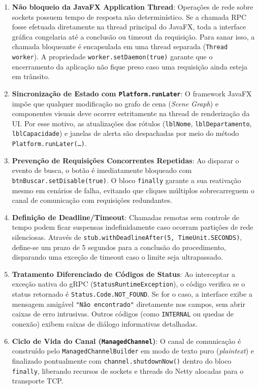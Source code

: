 \documentclass[12pt,a4paper]{article}
\begin{document}
\begin{enumerate}
    \item \textbf{Não bloqueio da JavaFX Application Thread}: Operações de rede sobre sockets possuem tempo de resposta não determinístico. Se a chamada RPC fosse efetuada diretamente na thread principal do JavaFX, toda a interface gráfica congelaria até a conclusão ou timeout da requisição. Para sanar isso, a chamada bloqueante é encapsulada em uma thread separada (\texttt{Thread worker}). A propriedade \texttt{worker.setDaemon(true)} garante que o encerramento da aplicação não fique preso caso uma requisição ainda esteja em trânsito.
    \item \textbf{Sincronização de Estado com \texttt{Platform.runLater}}: O framework JavaFX impõe que qualquer modificação no grafo de cena (\textit{Scene Graph}) e componentes visuais deve ocorrer estritamente na thread de renderização da UI. Por esse motivo, as atualizações dos rótulos (\texttt{lblNome}, \texttt{lblDepartamento}, \texttt{lblCapacidade}) e janelas de alerta são despachadas por meio do método \texttt{Platform.runLater(\dots)}.
    \item \textbf{Prevenção de Requisições Concorrentes Repetidas}: Ao disparar o evento de busca, o botão é imediatamente bloqueado com \texttt{btnBuscar.}\allowbreak\texttt{setDisable(true)}. O bloco \texttt{finally} garante a sua reativação mesmo em cenários de falha, evitando que cliques múltiplos sobrecarreguem o canal de comunicação com requisições redundantes.
    \item \textbf{Definição de Deadline/Timeout}: Chamadas remotas sem controle de tempo podem ficar suspensas indefinidamente caso ocorram partições de rede silenciosas. Através de \texttt{stub.withDeadlineAfter(5, TimeUnit.SECONDS)}, define-se um prazo de 5 segundos para a conclusão do procedimento, disparando uma exceção de timeout caso o limite seja ultrapassado.
    \item \textbf{Tratamento Diferenciado de Códigos de Status}: Ao interceptar a exceção nativa do gRPC (\texttt{StatusRuntimeException}), o código verifica se o status retornado é \texttt{Status.Code.}\allowbreak\texttt{NOT\_FOUND}. Se for o caso, a interface exibe a mensagem amigável \texttt{"Não encontrado"} diretamente nos campos, sem abrir caixas de erro intrusivas. Outros códigos (como \texttt{INTERNAL} ou quedas de conexão) exibem caixas de diálogo informativas detalhadas.
    \item \textbf{Ciclo de Vida do Canal (\texttt{ManagedChannel})}: O canal de comunicação é construído pelo \texttt{ManagedChannelBuilder} em modo de texto puro (\textit{plaintext}) e finalizado pontualmente com \texttt{channel.shutdownNow()} dentro do bloco \texttt{finally}, liberando recursos de sockets e threads do Netty alocadas para o transporte TCP.
\end{enumerate}
\end{document}
